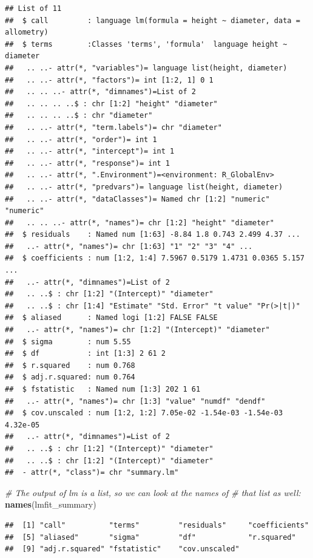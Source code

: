 \documentclass[]{book}
\newenvironment{Shaded}{\begin{snugshade}}{\end{snugshade}}
\newcommand{\CommentTok}[1]{\textcolor[rgb]{0.56,0.35,0.01}{\textit{#1}}}
\newcommand{\KeywordTok}[1]{\textcolor[rgb]{0.13,0.29,0.53}{\textbf{#1}}}
\newcommand{\NormalTok}[1]{#1}
\begin{document}
\begin{verbatim}
## List of 11
##  $ call         : language lm(formula = height ~ diameter, data = allometry)
##  $ terms        :Classes 'terms', 'formula'  language height ~ diameter
##   .. ..- attr(*, "variables")= language list(height, diameter)
##   .. ..- attr(*, "factors")= int [1:2, 1] 0 1
##   .. .. ..- attr(*, "dimnames")=List of 2
##   .. .. .. ..$ : chr [1:2] "height" "diameter"
##   .. .. .. ..$ : chr "diameter"
##   .. ..- attr(*, "term.labels")= chr "diameter"
##   .. ..- attr(*, "order")= int 1
##   .. ..- attr(*, "intercept")= int 1
##   .. ..- attr(*, "response")= int 1
##   .. ..- attr(*, ".Environment")=<environment: R_GlobalEnv> 
##   .. ..- attr(*, "predvars")= language list(height, diameter)
##   .. ..- attr(*, "dataClasses")= Named chr [1:2] "numeric" "numeric"
##   .. .. ..- attr(*, "names")= chr [1:2] "height" "diameter"
##  $ residuals    : Named num [1:63] -8.84 1.8 0.743 2.499 4.37 ...
##   ..- attr(*, "names")= chr [1:63] "1" "2" "3" "4" ...
##  $ coefficients : num [1:2, 1:4] 7.5967 0.5179 1.4731 0.0365 5.157 ...
##   ..- attr(*, "dimnames")=List of 2
##   .. ..$ : chr [1:2] "(Intercept)" "diameter"
##   .. ..$ : chr [1:4] "Estimate" "Std. Error" "t value" "Pr(>|t|)"
##  $ aliased      : Named logi [1:2] FALSE FALSE
##   ..- attr(*, "names")= chr [1:2] "(Intercept)" "diameter"
##  $ sigma        : num 5.55
##  $ df           : int [1:3] 2 61 2
##  $ r.squared    : num 0.768
##  $ adj.r.squared: num 0.764
##  $ fstatistic   : Named num [1:3] 202 1 61
##   ..- attr(*, "names")= chr [1:3] "value" "numdf" "dendf"
##  $ cov.unscaled : num [1:2, 1:2] 7.05e-02 -1.54e-03 -1.54e-03 4.32e-05
##   ..- attr(*, "dimnames")=List of 2
##   .. ..$ : chr [1:2] "(Intercept)" "diameter"
##   .. ..$ : chr [1:2] "(Intercept)" "diameter"
##  - attr(*, "class")= chr "summary.lm"
\end{verbatim}

\begin{Shaded}
\begin{Highlighting}[]
\CommentTok{# The output of lm is a list, so we can look at the names of # that list as well:}
\KeywordTok{names}\NormalTok{(lmfit_summary)}
\end{Highlighting}
\end{Shaded}

\begin{verbatim}
##  [1] "call"          "terms"         "residuals"     "coefficients" 
##  [5] "aliased"       "sigma"         "df"            "r.squared"    
##  [9] "adj.r.squared" "fstatistic"    "cov.unscaled"
\end{verbatim}
\end{document}
